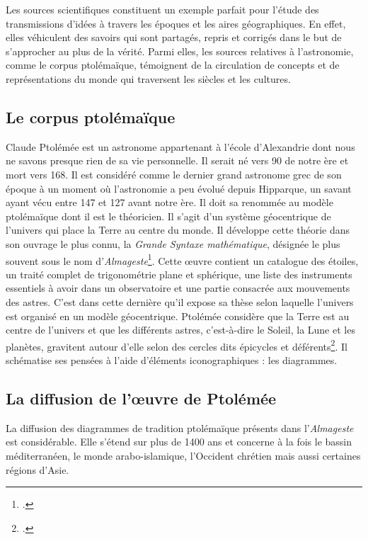 Les sources scientifiques constituent un exemple parfait pour l'étude des transmissions d'idées à travers les époques et les aires géographiques.
En effet, elles véhiculent des savoirs qui sont partagés, repris et corrigés dans le but de s'approcher au plus de la vérité.
Parmi elles, les sources relatives à l'astronomie, comme le corpus ptolémaïque, témoignent de la circulation de concepts et de représentations du monde qui traversent les siècles et les cultures.

\subsection{Le corpus ptolémaïque}
Claude Ptolémée est un astronome appartenant à l'école d'Alexandrie dont nous ne savons presque rien de sa vie personnelle. Il serait né vers 90 de notre ère et mort vers 168.
Il est considéré comme le dernier grand astronome grec de son époque à un moment où l'astronomie a peu évolué depuis Hipparque, un savant ayant vécu entre 147 et 127 avant notre ère.
Il doit sa renommée au modèle ptolémaïque dont il est le théoricien. Il s'agit d'un système géocentrique de l'univers qui place la Terre au centre du monde.
Il développe cette théorie dans son ouvrage le plus connu, la \textit{Grande Syntaxe mathématique}, désignée le plus souvent sous le nom d'\textit{Almageste}\footcite{verdetLaubeLastronomieLaurore1990}.
Cette œuvre contient un catalogue des étoiles, un traité complet de trigonométrie plane et sphérique, une liste des instruments essentiels à avoir dans un observatoire et une partie consacrée aux mouvements des astres.
C'est dans cette dernière qu'il expose sa thèse selon laquelle l'univers est organisé en un modèle géocentrique.
Ptolémée considère que la Terre est au centre de l'univers et que les différents astres, c'est-à-dire le Soleil, la Lune et les planètes, gravitent autour d'elle selon des cercles dits épicycles et déférents\footcite{costabelCLAUDEPTOLEMEE90}.
Il schématise ses pensées à l'aide d'éléments iconographiques : les diagrammes.

\subsection{La diffusion de l'œuvre de Ptolémée}
La diffusion des diagrammes de tradition ptolémaïque présents dans l'\textit{Almageste} est considérable.
Elle s'étend sur plus de 1400 ans et concerne à la fois le bassin méditerranéen, le monde arabo-islamique, l'Occident chrétien mais aussi certaines régions d'Asie.

